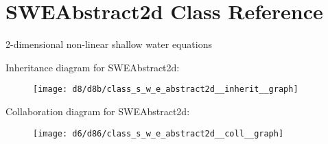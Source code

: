 \hypertarget{class_s_w_e_abstract2d}{}\section{S\+W\+E\+Abstract2d Class Reference}
\label{class_s_w_e_abstract2d}


2-\/dimensional non-\/linear shallow water equations  




Inheritance diagram for S\+W\+E\+Abstract2d\+:
\nopagebreak
\begin{figure}[H]
\begin{center}
\leavevmode
\texttt{[image: d8/d8b/class\_s\_w\_e\_abstract2d\_\_inherit\_\_graph]}
\end{center}
\end{figure}


Collaboration diagram for S\+W\+E\+Abstract2d\+:
\nopagebreak
\begin{figure}[H]
\begin{center}
\leavevmode
\texttt{[image: d6/d86/class\_s\_w\_e\_abstract2d\_\_coll\_\_graph]}
\end{center}
\end{figure}
